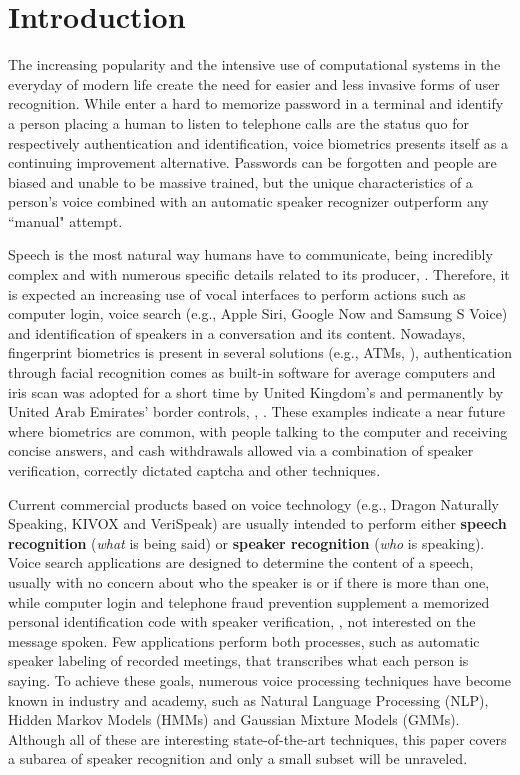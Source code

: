 \chapter{Introduction}
\label{ch:intro}

The increasing popularity and the intensive use of computational systems in the everyday of modern life create the need for easier and less invasive forms of user recognition. While enter a hard to memorize password in a terminal and identify a person placing a human to listen to telephone calls are the status quo for respectively authentication and identification, voice biometrics presents itself as a continuing improvement alternative. Passwords can be forgotten and people are biased and unable to be massive trained, but the unique characteristics of a person's voice combined with an automatic speaker recognizer outperform any ``manual" attempt.

Speech is the most natural way humans have to communicate, being incredibly complex and with numerous specific details related to its producer, . Therefore, it is expected an increasing use of vocal interfaces to perform actions such as computer login, voice search (e.g., Apple Siri, Google Now and Samsung S Voice) and identification of speakers in a conversation and its content. Nowadays, fingerprint biometrics is present in several solutions (e.g., ATMs, ), authentication through facial recognition comes as built-in software for average computers and iris scan was adopted for a short time by United Kingdom's and permanently by United Arab Emirates' border controls, , . These examples indicate a near future where biometrics are common, with people talking to the computer and receiving concise answers, and cash withdrawals allowed via a combination of speaker verification, correctly dictated captcha and other techniques.

Current commercial products based on voice technology (e.g., Dragon Naturally Speaking, KIVOX and VeriSpeak) are usually intended to perform either \textbf{speech recognition} (\emph{what} is being said) or \textbf{speaker recognition} (\emph{who} is speaking). Voice search applications are designed to determine the content of a speech, usually with no concern about who the speaker is or if there is more than one, while computer login and telephone fraud prevention supplement a memorized personal identification code with speaker verification, , not interested on the message spoken. Few applications perform both processes, such as automatic speaker labeling of recorded meetings, that transcribes what each person is saying. To achieve these goals, numerous voice processing techniques have become known in industry and academy, such as Natural Language Processing (NLP), Hidden Markov Models (HMMs) and Gaussian Mixture Models (GMMs). Although all of these are interesting state-of-the-art techniques, this paper covers a subarea of speaker recognition and only a small subset will be unraveled.

